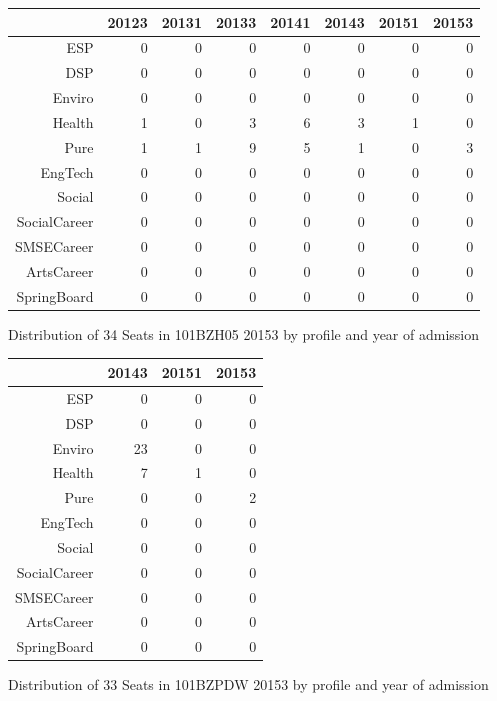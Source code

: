 \documentclass{article}\usepackage[]{graphicx}\usepackage[]{color}
\begin{document}
\begin{figure}[H]
\centering
\begin{tabular}{rrrrrrrr}
  \hline
 & 20123 & 20131 & 20133 & 20141 & 20143 & 20151 & 20153 \\ 
  \hline
ESP &   0 &   0 &   0 &   0 &   0 &   0 &   0 \\ 
  DSP &   0 &   0 &   0 &   0 &   0 &   0 &   0 \\ 
  Enviro &   0 &   0 &   0 &   0 &   0 &   0 &   0 \\ 
  Health &   1 &   0 &   3 &   6 &   3 &   1 &   0 \\ 
  Pure &   1 &   1 &   9 &   5 &   1 &   0 &   3 \\ 
  EngTech &   0 &   0 &   0 &   0 &   0 &   0 &   0 \\ 
  Social &   0 &   0 &   0 &   0 &   0 &   0 &   0 \\ 
  SocialCareer &   0 &   0 &   0 &   0 &   0 &   0 &   0 \\ 
  SMSECareer &   0 &   0 &   0 &   0 &   0 &   0 &   0 \\ 
  ArtsCareer &   0 &   0 &   0 &   0 &   0 &   0 &   0 \\ 
  SpringBoard &   0 &   0 &   0 &   0 &   0 &   0 &   0 \\ 
   \hline
\end{tabular}
\caption{Distribution of 34 Seats in 101BZH05 20153 by profile and year of admission} 
\end{figure}
\begin{figure}[H]
\centering
\begin{tabular}{rrrr}
  \hline
 & 20143 & 20151 & 20153 \\ 
  \hline
ESP &   0 &   0 &   0 \\ 
  DSP &   0 &   0 &   0 \\ 
  Enviro &  23 &   0 &   0 \\ 
  Health &   7 &   1 &   0 \\ 
  Pure &   0 &   0 &   2 \\ 
  EngTech &   0 &   0 &   0 \\ 
  Social &   0 &   0 &   0 \\ 
  SocialCareer &   0 &   0 &   0 \\ 
  SMSECareer &   0 &   0 &   0 \\ 
  ArtsCareer &   0 &   0 &   0 \\ 
  SpringBoard &   0 &   0 &   0 \\ 
   \hline
\end{tabular}
\caption{Distribution of 33 Seats in 101BZPDW 20153 by profile and year of admission} 
\end{figure}
\end{document}
